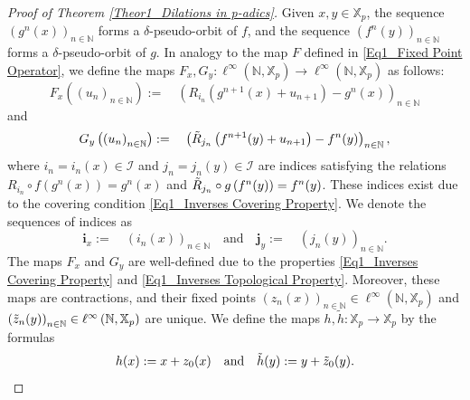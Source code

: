 \documentclass[a4paper, 12pt]{article}
\theoremstyle{definition}
\begin{document}
\begin{proof}[Proof of Theorem \ref{Theor1_Dilations in p-adics}]
		Given $x,y \in \mathbb{X}_{p}$, the sequence $  \left(  g^{n} \left(  x \right)    \right)_{n \in \mathbb{N} }$ forms a $\delta$-pseudo-orbit of $f$, and the sequence $  \left(   f^{n}(y)   \right)_{n \in \mathbb{N} }$ forms a $\delta$-pseudo-orbit of $g$.
		In analogy to the map $F$ defined in \eqref{Eq1_Fixed Point Operator}, we define the maps $F_{x}, G_{y}: \ell^{ \infty } \left(   \mathbb{N} ,   \mathbb{X}_{p}  \right) \to \ell^{ \infty } \left(   \mathbb{N} ,   \mathbb{X}_{p}  \right) $ as follows: 
		\begin{equation}\label{Eq1_Theor1_Sh Operator F}
			F_{x}  \left(   \left(  u_{n}   \right)_{n \in \mathbb{N} }  \right)  := \quad  \left(  R_{i_{n}} \left(  g^{n+1}(x) + u_{n+1}  \right)  - g^{n}(x)   \right)_{n \in \mathbb{N} } 
		\end{equation}
		and
		\begin{equation}\label{Eq1_Prop1_Sh Operator G}
			G_{y} \left(   \left(  u_{n}   \right)_{n \in \mathbb{N} }  \right)  := \quad  \left(  \Tilde{R}_{j_{n}} \left(  f^{n+1}(y) + u_{n+1}  \right)  - f^{n}(y)   \right)_{n \in \mathbb{N} } ,
		\end{equation} 
		where $i_{n} = i_{n}(x) \in \mathcal{I}$ and $j_{n} = j_{n}(y) \in \mathcal{I}$ are indices satisfying the relations $R_{i_{n}} \circ f \left(  g^{n}(x)  \right)  = g^{n}(x)$ and $\Tilde{R}_{j_{n}} \circ g  \left(  f^{n}(y)  \right)  = f^{n}(y)$.
		These indices exist due to the covering condition \eqref{Eq1_Inverses Covering Property}. We denote the sequences of indices as 
		\begin{equation}\label{Eq1_Indices Operator FG}
			\mathbf{i}_{x} := \quad  \left(  i_{n}(x)   \right)_{n \in \mathbb{N} } \quad \text{and}           \quad  \mathbf{j}_{y} := \quad  \left(  j_{n}(y)   \right)_{n \in \mathbb{N} }.
		\end{equation}
		The maps $F_{x}$ and $G_{y}$ are well-defined due to the properties \eqref{Eq1_Inverses Covering Property} and \eqref{Eq1_Inverses Topological Property}.
		Moreover, these maps are contractions, and their fixed points $  \left(  z_{n}(x)   \right)_{n \in \mathbb{N} } \in \ell^{ \infty } \left(   \mathbb{N} ,   \mathbb{X}_{p}  \right) $ and $  \left(  \Tilde{z}_{n}(y)   \right)_{n \in \mathbb{N} } \in \ell^{ \infty } \left(   \mathbb{N} ,   \mathbb{X}_{p}  \right) $ are unique. 
		We define the maps $h, \tilde{h}: \mathbb{X}_{p} \to \mathbb{X}_{p}$ by the formulas 
		\begin{equation}\label{Eq1_Conjugation Lipschitz Structurally Stable FG}
			h(x)  :=   x + z_{0}(x) \quad \text{and} \quad  \Tilde{h}(y) :=   y + \tilde{z}_{0}(y) . 

\end{equation}
\end{proof}
\end{document}
